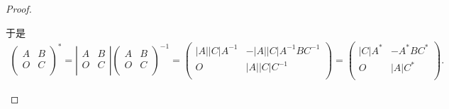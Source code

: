\documentclass[../../main.tex]{subfiles}%
\begin{document}
\begin{proof}
\begin{enumerate}
于是
\begin{align*}
\left( \begin{matrix}
A&		B\\
O&		C\\
\end{matrix} \right) ^*=\left| \begin{matrix}
A&		B\\
O&		C\\
\end{matrix} \right|\left( \begin{matrix}
A&		B\\
O&		C\\
\end{matrix} \right) ^{-1}=\left( \begin{matrix}
\left| A \right|\left| C \right|A^{-1}&		-\left| A \right|\left| C \right|A^{-1}BC^{-1}\\
O&		\left| A \right|\left| C \right|C^{-1}\\
\end{matrix} \right) =\left( \begin{matrix}
\left| C \right|A^*&		-A^*BC^*\\
O&		\left| A \right|C^*\\
\end{matrix} \right) .
\end{align*}


\end{enumerate}
\end{proof}
\end{document}
